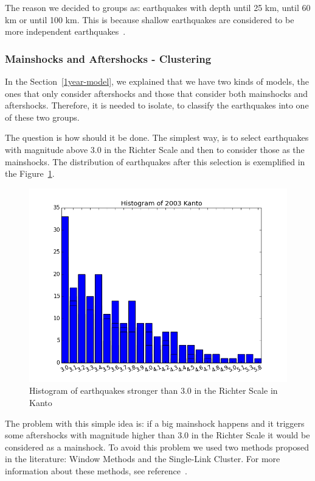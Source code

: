 The reason we decided to groups as: earthquakes with depth until 25 km, until 60 km or until 100 km. This is because shallow earthquakes are considered to be more independent earthquakes~\cite{yamanaka1990scaling}.

\subsubsection{Mainshocks and Aftershocks - Clustering}\label{Clustering}

In the Section~\ref{1year-model}, we explained that we have two kinds of models, the ones that only consider aftershocks and those that consider both mainshocks and aftershocks. Therefore, it is needed to isolate, to classify the earthquakes into one of these two groups.

The question is how should it be done. The simplest way, is to select earthquakes with magnitude above 3.0 in the Richter Scale and then to consider those as the mainshocks. The distribution of earthquakes after this selection is exemplified in the Figure~\ref{quakesKanto}.

\begin{figure}[H]
	\centering
	\includegraphics[scale=0.35]{img/Magnitude2003Kanto.png}
	\caption{Histogram of earthquakes stronger than 3.0 in the Richter Scale in Kanto}
	\label{quakesKanto}
\end{figure}

The problem with this simple idea is: if a big mainshock happens and it triggers some aftershocks with magnitude higher than 3.0 in the Richter Scale it would be considered as a mainshock. To avoid this problem we used two methods proposed in the literature: Window Methods and the Single-Link Cluster. For more information about these methods, see reference~\cite{van2012seismicity}.

